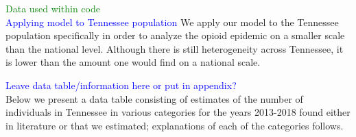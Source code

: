 \documentclass[12pt]{article}
\begin{document}
 \textcolor{green}{Data used within code} \\
 \textcolor{blue}{Applying model to Tennessee population}
We apply our model to the Tennessee population specifically in order to analyze the opioid epidemic on a smaller scale than the national level. Although there is still heterogeneity across Tennessee, it is lower than the amount one would find on a national scale.


\textcolor{blue}{Leave data table/information here or put in appendix?} \\
Below we present a data table consisting of estimates of the number of individuals in Tennessee in various categories for the years 2013-2018 found either in literature or that we estimated; explanations of each of the categories follows. 

\end{document}
